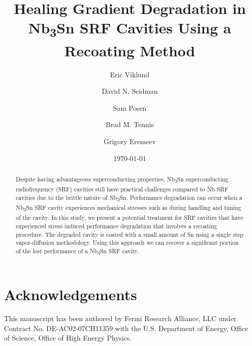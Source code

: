 \documentclass{revtex4-2}
\begin{document}
\title{Healing Gradient Degradation in Nb\textsubscript{3}Sn SRF Cavities Using a Recoating Method}
\author{Eric Viklund}
\author{David N. Seidman}
\author{Sam Posen}
\author{Brad M. Tennis}
\author{Grigory Eremeev}


\date{\today}

\begin{abstract}

    Despite having advantageous superconducting properties, Nb\textsubscript{3}Sn superconducting radiofrequency (SRF) cavities still have practical challenges compared to Nb SRF cavities due to the brittle nature of Nb\textsubscript{3}Sn. Performance degradation can occur when a Nb\textsubscript{3}Sn SRF cavity experiences mechanical stresses such as during handling and tuning of the cavity. In this study, we present a potential treatment for SRF cavities that have experienced stress induced performance degradation that involves a recoating procedure. The degraded cavity is coated with a small amount of Sn using a single step vapor-diffusion methodology. Using this approach we can recover a significant portion of the lost performance of a Nb\textsubscript{3}Sn SRF cavity.

\end{abstract}

\maketitle



\section{Acknowledgements}

This manuscript has been authored by Fermi Research Alliance, LLC under Contract No. DE-AC02-07CH11359 with the U.S. Department of Energy, Office of Science, Office of High Energy Physics.



\end{document}
